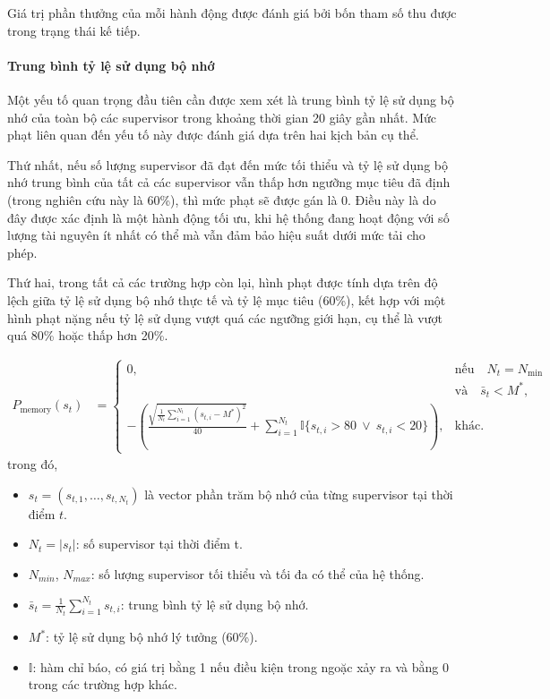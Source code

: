 Giá trị phần thưởng của mỗi hành động được đánh giá bởi bốn tham số thu được trong trạng thái kế tiếp.

\paragraph{Trung bình tỷ lệ sử dụng bộ nhớ}

Một yếu tố quan trọng đầu tiên cần được xem xét là trung bình tỷ lệ sử dụng bộ nhớ của toàn bộ các supervisor trong khoảng thời gian 20 giây gần nhất. Mức phạt liên quan đến yếu tố này được đánh giá dựa trên hai kịch bản cụ thể.

Thứ nhất, nếu số lượng supervisor đã đạt đến mức tối thiểu và tỷ lệ sử dụng bộ nhớ trung bình của tất cả các supervisor vẫn thấp hơn ngưỡng mục tiêu đã định (trong nghiên cứu này là 60\%), thì mức phạt sẽ được gán là 0. Điều này là do đây được xác định là một hành động tối ưu, khi hệ thống đang hoạt động với số lượng tài nguyên ít nhất có thể mà vẫn đảm bảo hiệu suất dưới mức tải cho phép.

Thứ hai, trong tất cả các trường hợp còn lại, hình phạt được tính dựa trên độ lệch giữa tỷ lệ sử dụng bộ nhớ thực tế và tỷ lệ mục tiêu (60\%), kết hợp với một hình phạt nặng nếu tỷ lệ sử dụng vượt quá các ngưỡng giới hạn, cụ thể là vượt quá 80\% hoặc thấp hơn 20\%.

\begin{equation}
    \begin{aligned}
        P_{\text{memory}}(s_t) & =
        \begin{cases}
            0,       & \text{nếu}\quad N_t = N_{\min} \quad \\[8pt]
                     & \text{và} \quad \bar{s}_t < M^*,     \\[8pt]
            -\left(
            \frac{
                \sqrt{\frac{1}{N_t} \sum\limits_{i=1}^{N_t} (s_{t,i} - M^*)^2}
            }{40}
            +
            \sum\limits_{i=1}^{N_t} \mathbb{I}\{s_{t,i} > 80 \ \vee\ s_{t,i} < 20\}
            \right), & \text{khác.}
        \end{cases}
    \end{aligned}
\end{equation}
trong đó,
\begin{itemize}
    \item $s_t = (s_{t,1},\dots,s_{t,N_t})$ là vector phần trăm bộ nhớ của từng supervisor tại thời điểm $t$.
    \item $N_t = |s_t|$: số supervisor tại thời điểm t.
    \item $N_{min}$, $N_{max}$: số lượng supervisor tối thiểu và tối đa có thể của hệ thống.
    \item $\bar s_t = \tfrac{1}{N_t}\sum_{i=1}^{N_t}s_{t,i}$: trung bình tỷ lệ sử dụng bộ nhớ.
    \item $M^*$: tỷ lệ sử dụng bộ nhớ lý tưởng (60\%).
    \item $\mathbb{I}$: hàm chỉ báo, có giá trị bằng 1 nếu điều kiện trong ngoặc xảy ra và bằng 0 trong các trường hợp khác.
\end{itemize}

